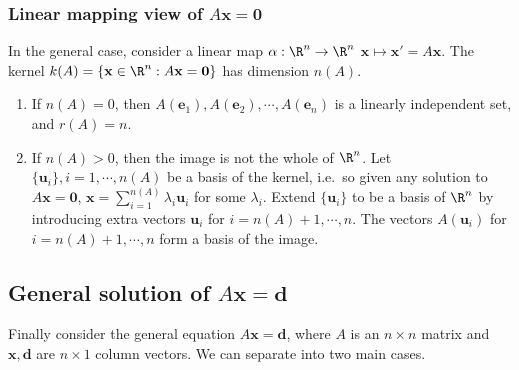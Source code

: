 \documentclass[a4paper]{article}
\begin{document}
\subsubsection{Linear mapping view of \texorpdfstring{$A\mathbf{x} = \mathbf{0}$}{Ax = 0}}
In the general case, consider a linear map $\alpha: \R^n \to \R^n$ $\mathbf{x} \mapsto \mathbf{x}' = A\mathbf{x}$. The kernel $k(A) = \{\mathbf{x}\in \R^n: A\mathbf{x} = \mathbf{0}\}$ has dimension $n(A)$.

\begin{enumerate}
  \item If $n(A) = 0$, then $A(\mathbf{e}_1), A(\mathbf{e}_2), \cdots, A(\mathbf{e}_n)$ is a linearly independent set, and $r(A) = n$.
  \item If $n(A) > 0$, then the image is not the whole of $\R^n$. Let $\{\mathbf{u}_i\}, i = 1, \cdots, n(A)$ be a basis of the kernel, i.e.\ so given any solution to $A\mathbf{x} = \mathbf{0}$, $\displaystyle \mathbf{x} = \sum_{i = 1}^{n(A)} \lambda_i \mathbf{u}_i$ for some $\lambda_i$. Extend $\{\mathbf{u}_i\}$ to be a basis of $\R^n$ by introducing extra vectors $\mathbf{u}_{i}$ for $i = n(A) + 1, \cdots, n$. The vectors $A(\mathbf{u}_i)$ for $i = n(A) + 1, \cdots, n$ form a basis of the image.
\end{enumerate}

\subsection{General solution of \texorpdfstring{$A\mathbf{x} = \mathbf{d}$}{Ax = d}}
Finally consider the general equation $A\mathbf{x} = \mathbf{d}$, where $A$ is an $n\times n$ matrix and $\mathbf{x}, \mathbf{d}$ are $n \times 1$ column vectors. We can separate into two main cases.
\end{document}
